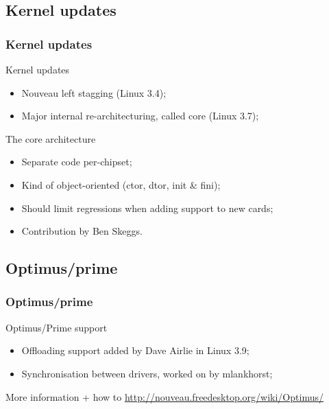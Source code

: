 \documentclass[11pt,english,compress]{beamer}
\begin{document}
\subsection*{Kernel updates}
\begin{frame}
	\frametitle{Kernel updates}

	\begin{block}{Kernel updates}
		\begin{itemize}
			\item Nouveau left stagging (Linux 3.4);
			\item Major internal re-architecturing, called core (Linux 3.7);
		\end{itemize}
	\end{block}

	\begin{block}{The core architecture}
		\begin{itemize}
			\item Separate code per-chipset;
			\item Kind of object-oriented (ctor, dtor, init \& fini);
			\item Should limit regressions when adding support to new cards;
			\item Contribution by Ben Skeggs.
		\end{itemize}
	\end{block}
\end{frame}

\subsection{Optimus/prime}

\begin{frame}
	\frametitle{Optimus/prime}

	\begin{block}{Optimus/Prime support}
		\begin{itemize}
			\item Offloading support added by Dave Airlie in Linux 3.9;
			\item Synchronisation between drivers, worked on by mlankhorst;
		\end{itemize}
	\end{block}

	\begin{block}{More information + how to}
		\url{http://nouveau.freedesktop.org/wiki/Optimus/}
	\end{block}
\end{frame}
\end{document}
